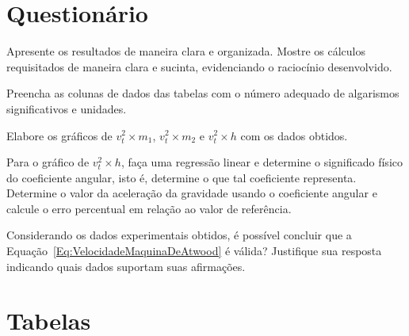 \vspace{5mm}

\section{Questionário}

\begin{question}[type={exam}]{1}
Apresente os resultados de maneira clara e organizada. Mostre os cálculos requisitados de maneira clara e sucinta, evidenciando o raciocínio desenvolvido.
\end{question}

\begin{question}[type={exam}]{1}
Preencha as colunas de dados das tabelas com o número adequado de algarismos significativos e unidades.
\end{question}

\begin{question}[type={exam}]{3}
Elabore os gráficos de $v_t^2 \times m_1$, $v_t^2 \times m_2$ e $v_t^2 \times h$ com os dados obtidos.
\end{question}

\begin{question}[type={exam}]{2}
Para o gráfico de $v_t^2 \times h$, faça uma regressão linear e determine o significado físico do coeficiente angular, isto é, determine o que tal coeficiente representa. Determine o valor da aceleração da gravidade usando o coeficiente angular e calcule o erro percentual em relação ao valor de referência.
\end{question}

\begin{question}[type={exam}]{3}
Considerando os dados experimentais obtidos, é possível concluir que a Equação~\eqref{Eq:VelocidadeMaquinaDeAtwood} é válida? Justifique sua resposta indicando quais dados suportam suas afirmações.
\end{question}

\vfill
\pagebreak
\section{Tabelas}


